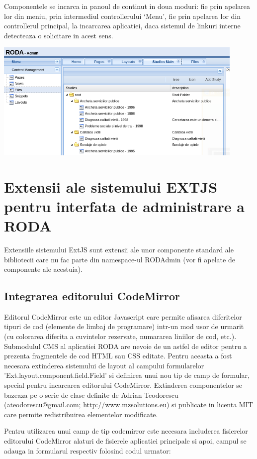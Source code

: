 Componentele se incarca in panoul de continut in doua moduri: fie prin apelarea lor din meniu, prin intermediul controllerului ‘Menu’, fie prin apelarea lor din controllerul principal, la incarcarea aplicatiei, daca sistemul de linkuri interne detecteaza o solicitare in acest sens. 


\includegraphics[width=12cm]{img/content-tabs}

\section{Extensii ale sistemului EXTJS pentru interfata de administrare a RODA}

Extensiile sistemului ExtJS sunt extensii ale unor componente standard ale bibliotecii care nu fac parte din namespace-ul RODAdmin (vor fi apelate de componente ale acestuia). 

\subsection{Integrarea editorului CodeMirror}

Editorul CodeMirror este un editor Javascript care permite afisarea diferitelor tipuri de cod (elemente de limbaj de programare) intr-un mod usor de urmarit (cu colorarea diferita a cuvintelor rezervate, numararea liniilor de cod, etc.). Submodulul CMS al aplicatiei RODA are nevoie de un astfel de editor pentru a prezenta fragmentele de cod HTML sau CSS editate. Pentru aceasta a fost necesara extinderea sistemului de layout al campului formularelor 'Ext.layout.component.field.Field' si definirea unui nou tip de camp de formular, special pentru incarcarea editorului CodeMirror. Extinderea componentelor se bazeaza pe o serie de clase definite de Adrian Teodorescu (ateodorescu@gmail.com; http://www.mzsolutions.eu) si publicate in licenta MIT care permite redistribuirea elementelor modificate. 

Pentru utilizarea unui camp de tip codemirror este necesara includerea fisierelor editorului CodeMirror alaturi de fisierele aplicatiei principale si apoi, campul se adauga in formularul respectiv folosind codul urmator: 

